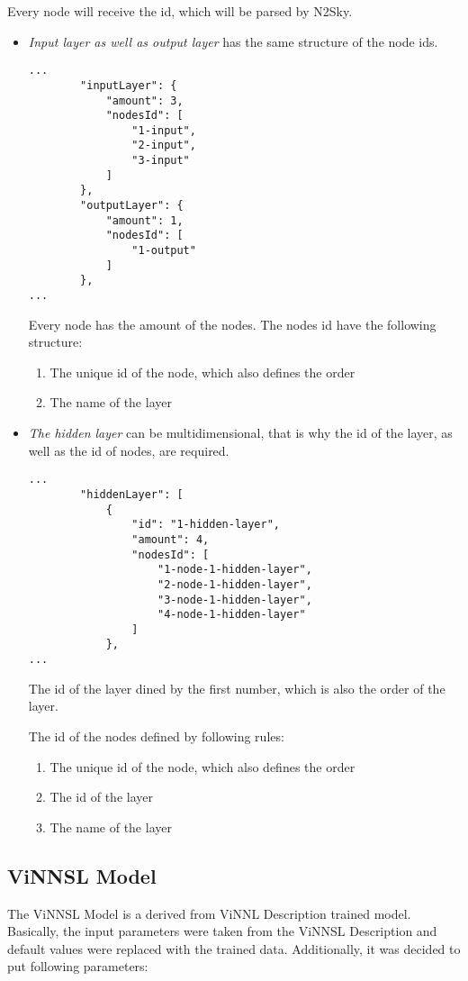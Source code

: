 Every node will receive the id, which will be parsed by N2Sky.

\begin{itemize}
\item \emph{Input layer as well as output layer} has the same structure of the node ids.
 \begin{lstlisting}
...
		"inputLayer": {
			"amount": 3,
			"nodesId": [
				"1-input",
				"2-input",
				"3-input"
			]
		},
		"outputLayer": {
			"amount": 1,
			"nodesId": [
				"1-output"
			]
		},
...
\end{lstlisting}

Every node has the amount of the nodes. The nodes id have the following structure: 
\begin{enumerate}
\item The unique id of the node, which also defines the order
\item The name of the layer
\end{enumerate}
\item \emph{The hidden layer} can be multidimensional, that is why the id of the layer, as well as the id of nodes, are required.


 \begin{lstlisting}
...
		"hiddenLayer": [
			{
				"id": "1-hidden-layer",
				"amount": 4,
				"nodesId": [
					"1-node-1-hidden-layer",
					"2-node-1-hidden-layer",
					"3-node-1-hidden-layer",
					"4-node-1-hidden-layer"
				]
			},
...
\end{lstlisting}

The id of the layer dined by the first number, which is also the order of the layer.

The id of the nodes defined by following rules:
\begin{enumerate}
\item The unique id of the node, which also defines the order
\item The id of the layer
\item The name of the layer
\end{enumerate}

\end{itemize}


\subsection{ViNNSL Model}\label{ViNNSL Model}

The ViNNSL Model is a derived from ViNNL Description trained model. Basically, the input parameters were taken from the ViNNSL Description and default values were replaced with the trained data. Additionally, it was decided to put following parameters:

